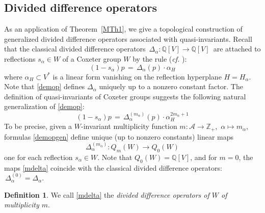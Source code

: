\documentclass[11pt]{amsart}
\theoremstyle{definition}
\newtheorem{defi}[theorem]{Definition}
\theoremstyle{remark}
\numberwithin{equation}{section}
\newcommand{\la}{\label}
\def\A{\mathcal{A}}
\def\Z{\mathbb{Z}}
\def\Q{\mathbb{Q}}
\begin{document}
\subsection{Divided difference operators}
\la{S4.4}
As an application of Theorem~\ref{MTh1}, we give a topological construction of generalized
divided difference operators associated with quasi-invariants. Recall that the classical divided difference operators $\,\Delta_{\alpha}: \Q[V] \to \Q[V] \,$ are attached to reflections
$ s_\alpha \in W $ of a Coxeter group $W$  by the rule ({\it cf.} \cite{D73, D74}):
%
\begin{equation}
\la{demop}
(1 - s_{\alpha})p \,= \,\Delta_\alpha(p) \cdot \alpha_H
\end{equation}
%
where $ \alpha_H \subset V^* $ is a linear form vanishing on the reflection hyperplane $ H = H_\alpha $.
Note that \eqref{demop} defines $ \Delta_\alpha $ uniquely up to a nonzero constant factor.
The definition of quasi-invariants of Coxeter groups suggests the following natural generalization of \eqref{demop}:
%
\begin{equation}
\la{demopgen}
(1 - s_{\alpha})p \,= \,\Delta^{(m_{\alpha})}_\alpha(p) \cdot \alpha^{2 m_\alpha + 1}_H
\end{equation}
%
To be precise, given a $W$-invariant multiplicity function $ m: \A \to \Z_+ $, $\, \alpha \mapsto m_{\alpha} $, formulas \eqref{demopgen} define unique (up to nonzero constants) linear maps 
%
\begin{equation}
\la{mdelta}
\Delta^{(m_{\alpha})}_\alpha: Q_m(W) \to Q_0(W) 
\end{equation}
%
one for each reflection $ s_{\alpha} \in W $. Note that $ Q_0(W) = \Q[V] $, and for $ m = 0 $, the 
maps \eqref{mdelta} coincide  with the classical divided difference operators: $\,\Delta^{(0)}_{\alpha} = \Delta_{\alpha} $. 
%
\begin{defi}
We call \eqref{mdelta} the {\it divided difference operators of $W$ of multiplicity $m$}. 
\end{defi}
%
\end{document}

